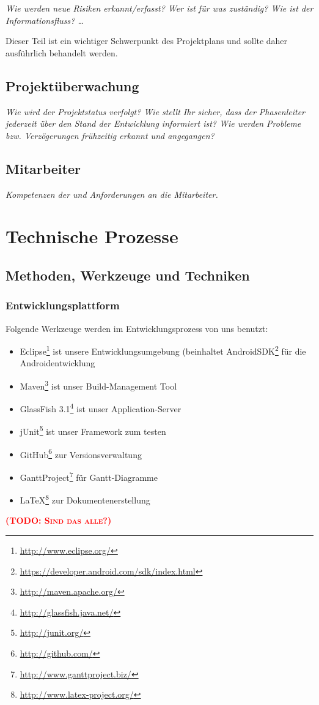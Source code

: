 \documentclass[fontsize=12pt,paper=a4,twoside]{scrartcl}
\newcommand{\todo}[1]{\textbf{\textsc{\textcolor{red}{(TODO: #1)}}}}
\begin{document}
{\em Wie werden neue Risiken erkannt/erfasst? Wer ist für was
  zuständig? Wie ist der Informationsfluss? \ldots 

Dieser Teil ist ein
  wichtiger Schwerpunkt des Projektplans und sollte daher ausführlich
  behandelt werden.}

\subsection{Projektüberwachung}\label{3.4-controlling}
{\em Wie wird der Projektstatus verfolgt? Wie stellt Ihr sicher, dass
  der Phasenleiter jederzeit über den Stand der Entwicklung informiert
  ist? Wie werden Probleme bzw. Verzögerungen frühzeitig erkannt und
  angegangen?}

\subsection{Mitarbeiter}
{\em Kompetenzen der und Anforderungen an die Mitarbeiter.}


\section{Technische Prozesse}
\subsection{Methoden, Werkzeuge und Techniken}
\subsubsection{Entwicklungsplattform}
Folgende Werkzeuge werden im Entwicklungsprozess von uns benutzt:
\begin{itemize}

\item{Eclipse\footnote{\url{http://www.eclipse.org/}} ist unsere Entwicklungsumgebung (beinhaltet AndroidSDK\footnote{\url{https://developer.android.com/sdk/index.html}} für die Androidentwicklung}
\item{Maven\footnote{\url{http://maven.apache.org/}} ist unser Build-Management Tool}
\item{GlassFish 3.1\footnote{\url{http://glassfish.java.net/}} ist unser Application-Server}
\item{jUnit\footnote{\url{http://junit.org/}} ist unser Framework zum testen}
\item{GitHub\footnote{\url{http://github.com/}} zur Versionsverwaltung}
\item{GanttProject\footnote{\url{http://www.ganttproject.biz/}}} für Gantt-Diagramme
\item{\LaTeX{}\footnote{\url{http://www.latex-project.org/}}} zur Dokumentenerstellung

\end{itemize}
\todo{Sind das alle?}
\end{document}
